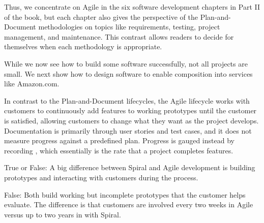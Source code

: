 Thus, we concentrate on Agile in the six software development chapters in Part II of the book,  but each chapter also gives the perspective of the Plan-and-Document methodologies on topics like requirements, testing, project management, and maintenance. This contrast allows readers to decide for themselves when each methodology is appropriate.

While we now see how to build some software successfully, not all projects are small. We next show how to design software to enable composition into services like Amazon.com.
\begin{summary}

 In contrast to the Plan-and-Document lifecycles, the Agile lifecycle works with customers to continuously add features to working prototypes until the customer is satisfied, allowing customers to change what they want as the project develops. Documentation is primarily through user stories and test cases, and it does not measure progress against a predefined plan. Progress is gauged instead by recording , which essentially is the rate that a project completes features.
\end{summary}

\begin{checkyourself}
  True or False: A big difference between Spiral and Agile development is building prototypes and interacting with customers during the process.
  \begin{answer}
  False: Both build working but incomplete prototypes that the customer helps evaluate. The difference is that customers are involved every two weeks in Agile versus up to two years in with Spiral.
  \end{answer}
\end{checkyourself}



